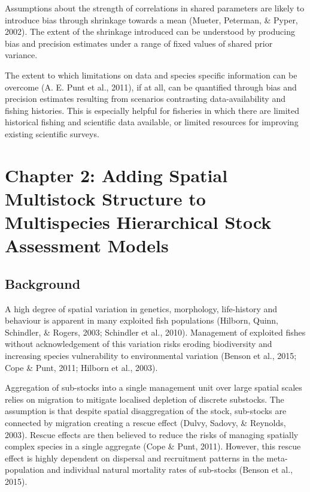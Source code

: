 \documentclass[12pt,]{scrartcl}
\begin{document}
Assumptions about the strength of correlations in shared parameters are
likely to introduce bias through shrinkage towards a mean (Mueter,
Peterman, \& Pyper, 2002). The extent of the shrinkage introduced can be
understood by producing bias and precision estimates under a range of
fixed values of shared prior variance.

The extent to which limitations on data and species specific information
can be overcome (A. E. Punt et al., 2011), if at all, can be quantified
through bias and precision estimates resulting from scenarios
contrasting data-availability and fishing histories. This is especially
helpful for fisheries in which there are limited historical fishing and
scientific data available, or limited resources for improving existing
scientific surveys.

\section{Chapter 2: Adding Spatial Multistock Structure to Multispecies
Hierarchical Stock Assessment
Models}\label{chapter-2-adding-spatial-multistock-structure-to-multispecies-hierarchical-stock-assessment-models}

\subsection{Background}\label{background-2}

A high degree of spatial variation in genetics, morphology, life-history
and behaviour is apparent in many exploited fish populations (Hilborn,
Quinn, Schindler, \& Rogers, 2003; Schindler et al., 2010). Management
of exploited fishes without acknowledgement of this variation risks
eroding biodiversity and increasing species vulnerability to
environmental variation (Benson et al., 2015; Cope \& Punt, 2011;
Hilborn et al., 2003).

Aggregation of sub-stocks into a single management unit over large
spatial scales relies on migration to mitigate localised depletion of
discrete substocks. The assumption is that despite spatial
disaggregation of the stock, sub-stocks are connected by migration
creating a rescue effect (Dulvy, Sadovy, \& Reynolds, 2003). Rescue
effects are then believed to reduce the risks of managing spatially
complex species in a single aggregate (Cope \& Punt, 2011). However,
this rescue effect is highly dependent on dispersal and recruitment
patterns in the meta-population and individual natural mortality rates
of sub-stocks (Benson et al., 2015).
\end{document}
